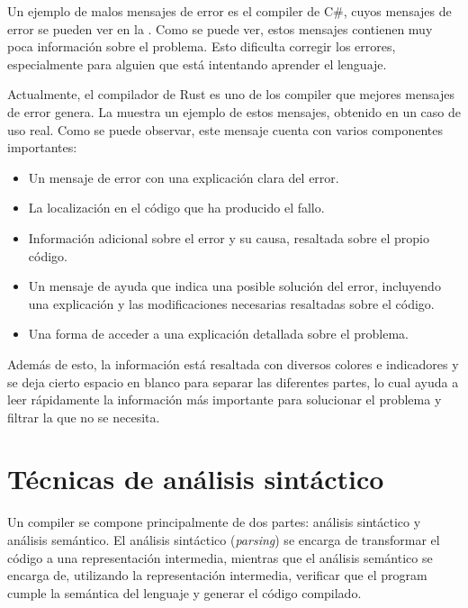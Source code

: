 Un ejemplo de malos mensajes de error es el \gls{compiler} de C\#, cuyos mensajes
de error se pueden ver en la . Como se puede ver, estos
mensajes contienen muy poca información sobre el problema. Esto dificulta
corregir los errores, especialmente para alguien que está intentando aprender el
lenguaje.


Actualmente, el compilador de Rust \parencite{Rust} es uno de los
compiler que mejores mensajes de error genera. La 
muestra un ejemplo de estos mensajes, obtenido en un caso de uso real. Como se
puede observar, este mensaje cuenta con varios componentes importantes:

\begin{itemize}
    \item Un mensaje de error con una explicación clara del error.
    \item La localización en el código que ha producido el fallo.
    \item Información adicional sobre el error y su causa, resaltada sobre el
    propio código.
    \item Un mensaje de ayuda que indica una posible solución del error,
    incluyendo una explicación y las modificaciones necesarias resaltadas sobre
    el código.
    \item Una forma de acceder a una explicación detallada sobre el problema.
\end{itemize}

Además de esto, la información está resaltada con diversos colores e indicadores
y se deja cierto espacio en blanco para separar las diferentes partes, lo cual
ayuda a leer rápidamente la información más importante para solucionar el
problema y filtrar la que no se necesita.


\FloatBarrier

\section{Técnicas de análisis sintáctico}\label{sec:parser-techniques}

Un \gls{compiler} se compone principalmente de dos partes: análisis sintáctico y
análisis semántico. El análisis sintáctico (\textit{parsing}) se encarga de
transformar el código a una representación intermedia, mientras que el análisis
semántico se encarga de, utilizando la representación intermedia, verificar que
el \gls{program} cumple la semántica del lenguaje y generar el código compilado.
\parencite{dragon-book}

